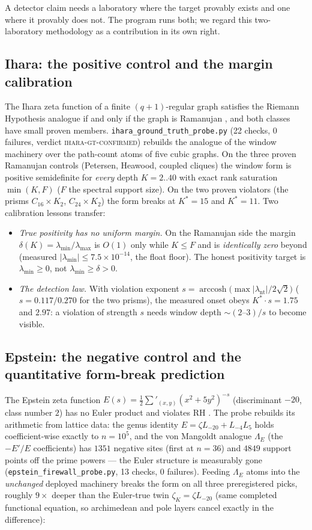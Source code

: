 \documentclass[11pt,a4paper]{article}
\theoremstyle{remark}
\newcommand{\Lam}{\Lambda}
\begin{document}
A detector claim needs a laboratory where the target provably exists
and one where it provably does not.  The program runs both; we regard
this two-laboratory methodology as a contribution in its own right.

\subsection{Ihara: the positive control and the margin calibration}

The Ihara zeta function of a finite $(q{+}1)$-regular graph satisfies
the Riemann Hypothesis analogue if and only if the graph is Ramanujan
\cite{Bass92}, and both classes have small proven members.
\texttt{ihara\_ground\_truth\_probe.py} (22 checks, 0 failures, verdict
\textsc{ihara-gt-confirmed}) rebuilds the analogue of the window
machinery over the path-count atoms of five cubic graphs.  On the three
proven Ramanujan controls (Petersen, Heawood, coupled cliques) the
window form is positive semidefinite for \emph{every} depth $K=2..40$
with exact rank saturation $\min(K,F)$ ($F$ the spectral support size).
On the two proven violators (the prisms $C_{16}\times K_2$,
$C_{24}\times K_2$) the form breaks at $K^*=15$ and $K^*=11$.  Two
calibration lessons transfer:
\begin{itemize}
\item[(i)] \emph{True positivity has no uniform margin.}  On the
Ramanujan side the margin $\delta(K)=\lambda_{\min}/\lambda_{\max}$ is
$O(1)$ only while $K\le F$ and is \emph{identically zero} beyond
(measured $|\lambda_{\min}|\le7.5\times10^{-14}$, the float floor).
The honest positivity target is $\lambda_{\min}\ge0$, not
$\lambda_{\min}\ge\delta>0$.
\item[(ii)] \emph{The detection law.}  With violation exponent
$s=\operatorname{arccosh}\bigl(\max|\lambda_{\mathrm{nt}}|/2\sqrt2\bigr)$
($s=0.117/0.270$ for the two prisms), the measured onset obeys
$K^*\!\cdot s=1.75$ and $2.97$: a violation of strength $s$ needs
window depth $\sim(2\text{--}3)/s$ to become visible.
\end{itemize}

\subsection{Epstein: the negative control and the quantitative
form-break prediction}

The Epstein zeta function $E(s)=\tfrac12\sum'_{(x,y)}(x^2+5y^2)^{-s}$
(discriminant $-20$, class number $2$) has no Euler product and
violates RH \cite{DH36}.  The probe rebuilds its arithmetic from
lattice data: the genus identity
$E=\zeta L_{-20}+L_{-4}L_{5}$ holds coefficient-wise exactly to
$n=10^5$, and the von Mangoldt analogue $\Lam_E$ (the $-E'/E$
coefficients) has $1351$ negative sites (first at $n=36$) and $4849$
support points off the prime powers --- the Euler structure is
measurably gone (\texttt{epstein\_firewall\_probe.py}, 13 checks, 0
failures).  Feeding $\Lam_E$ atoms into the \emph{unchanged} deployed
machinery breaks the form on all three preregistered picks, roughly
$9\times$ deeper than the Euler-true twin
$\zeta_K=\zeta L_{-20}$ (same completed functional equation, so
archimedean and pole layers cancel exactly in the difference):
\end{document}
